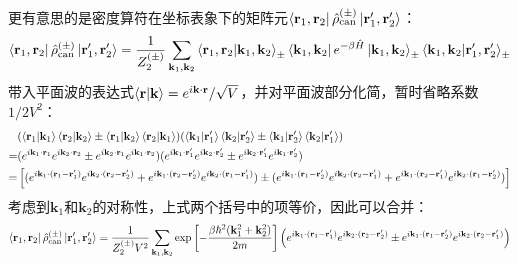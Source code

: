 更有意思的是密度算符在坐标表象下的矩阵元$\bra{\mathbf{r}_1,\mathbf{r}_2}\hat{\rho}_{\rm can}^{(\pm)}\ket{\mathbf{r}_1',\mathbf{r}_2'}$：
\[\bra{\mathbf{r}_1,\mathbf{r}_2}\hat{\rho}_{\rm can}^{(\pm)}\ket{\mathbf{r}_1',\mathbf{r}_2'}=\frac{1}{Z_2^{(\pm)}}\sum_{\mathbf{k}_1,\mathbf{k}_2}\bra{\mathbf{r}_1,\mathbf{r}_2}\ket{\mathbf{k}_1,\mathbf{k}_2}_\pm\bra{\mathbf{k}_1,\mathbf{k}_2}e^{-\beta\hat{H}}\ket{\mathbf{k}_1,\mathbf{k}_2}_\pm\bra{\mathbf{k}_1,\mathbf{k}_2}\ket{\mathbf{r}_1',\mathbf{r}_2'}_{\pm}\]
带入平面波的表达式$\bra{\mathbf{r}}\ket{\mathbf{k}}=e^{i\mathbf{k}\cdot\mathbf{r}}/\sqrt{V}$，并对平面波部分化简，暂时省略系数$1/2V^2$：
\[\begin{aligned}
&(\bra{\mathbf{r}_1}\ket{\mathbf{k}_1}\bra{\mathbf{r}_2}\ket{\mathbf{k}_2}\pm\bra{\mathbf{r}_1}\ket{\mathbf{k}_2}\bra{\mathbf{r}_2}\ket{\mathbf{k}_1})(\bra{\mathbf{k}_1}\ket{\mathbf{r}_1'}\bra{\mathbf{k}_2}\ket{\mathbf{r}_2'}\pm\bra{\mathbf{k}_1}\ket{\mathbf{r}_2'}\bra{\mathbf{k}_2}\ket{\mathbf{r}_1'})\\
=&(e^{i\mathbf{k}_1\cdot\mathbf{r}_1}e^{i\mathbf{k}_2\cdot\mathbf{r}_2}\pm e^{i\mathbf{k}_2\cdot\mathbf{r}_1}e^{i\mathbf{k}_1\cdot\mathbf{r}_2})(e^{i\mathbf{k}_1\cdot\mathbf{r}_1'}e^{i\mathbf{k}_2\cdot\mathbf{r}_2'}\pm e^{i\mathbf{k}_2\cdot\mathbf{r}_1'}e^{i\mathbf{k}_1\cdot\mathbf{r}_2'})\\
=&\left[(e^{i\mathbf{k}_1\cdot(\mathbf{r}_1-\mathbf{r}_1')}e^{i\mathbf{k}_2\cdot(\mathbf{r}_2-\mathbf{r}_2')}+e^{i\mathbf{k}_1\cdot(\mathbf{r}_2-\mathbf{r}_2')}e^{i\mathbf{k}_2\cdot(\mathbf{r}_1-\mathbf{r}_1')})\pm(e^{i\mathbf{k}_1\cdot(\mathbf{r}_1-\mathbf{r}_2')}e^{i\mathbf{k}_2\cdot(\mathbf{r}_2-\mathbf{r}_1')}+e^{i\mathbf{k}_1\cdot(\mathbf{r}_2-\mathbf{r}_1')}e^{i\mathbf{k}_2\cdot(\mathbf{r}_1-\mathbf{r}_2')})\right]\\
\end{aligned}\]
考虑到$\mathbf{k}_1$和$\mathbf{k}_2$的对称性，上式两个括号中的项等价，因此可以合并：
\[\bra{\mathbf{r}_1,\mathbf{r}_2}\hat{\rho}_{\rm can}^{(\pm)}\ket{\mathbf{r}_1',\mathbf{r}_2'}=\frac{1}{Z_2^{(\pm)}V^2}\sum_{\mathbf{k}_1,\mathbf{k}_2}\exp\left[-\frac{\beta\hbar^2(\mathbf{k}_1^2+\mathbf{k}_2^2)}{2m}\right]\left(e^{i\mathbf{k}_1\cdot(\mathbf{r}_1-\mathbf{r}_1')}e^{i\mathbf{k}_2\cdot(\mathbf{r}_2-\mathbf{r}_2')}\pm e^{i\mathbf{k}_1\cdot(\mathbf{r}_1-\mathbf{r}_2')}e^{i\mathbf{k}_2\cdot(\mathbf{r}_2-\mathbf{r}_1')}\right)\]

